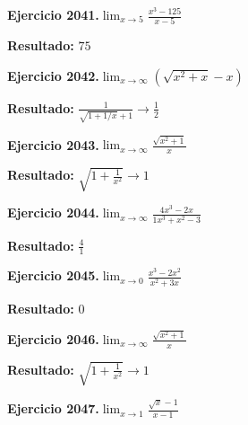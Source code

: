 \documentclass[10pt,a4paper]{article}
\begin{document}
\begin{ejbox}
\textbf{Ejercicio 2041.}\quad $\lim_{x\to 5} \frac{x^3-125}{x-5}$
\end{ejbox}

\begin{solbox}
\textbf{Resultado:} \(\displaystyle 75\)
\end{solbox}

\newpage
\begin{ejbox}
\textbf{Ejercicio 2042.}\quad $\lim_{x\to \infty} (\sqrt{x^2+x} - x)$
\end{ejbox}

\begin{solbox}
\textbf{Resultado:} \(\displaystyle \frac{1}{\sqrt{1+1/x}+1} \to \frac{1}{2}\)
\end{solbox}

\begin{ejbox}
\textbf{Ejercicio 2043.}\quad $\lim_{x\to \infty} \frac{\sqrt{x^2+1}}{x}$
\end{ejbox}

\begin{solbox}
\textbf{Resultado:} \(\displaystyle \sqrt{1+\frac{1}{x^2}} \to 1\)
\end{solbox}

\begin{ejbox}
\textbf{Ejercicio 2044.}\quad $\lim_{x\to \infty} \frac{4x^3 - 2x}{1x^3 + x^2 - 3}$
\end{ejbox}

\begin{solbox}
\textbf{Resultado:} \(\displaystyle \frac{4}{1}\)
\end{solbox}

\newpage
\begin{ejbox}
\textbf{Ejercicio 2045.}\quad $\lim_{x\to 0} \frac{x^3-2x^2}{x^2+3x}$
\end{ejbox}

\begin{solbox}
\textbf{Resultado:} \(\displaystyle 0\)
\end{solbox}

\begin{ejbox}
\textbf{Ejercicio 2046.}\quad $\lim_{x\to \infty} \frac{\sqrt{x^2+1}}{x}$
\end{ejbox}

\begin{solbox}
\textbf{Resultado:} \(\displaystyle \sqrt{1+\frac{1}{x^2}} \to 1\)
\end{solbox}

\begin{ejbox}
\textbf{Ejercicio 2047.}\quad $\lim_{x\to 1} \frac{\sqrt{x}-1}{x-1}$
\end{ejbox}
\end{document}
